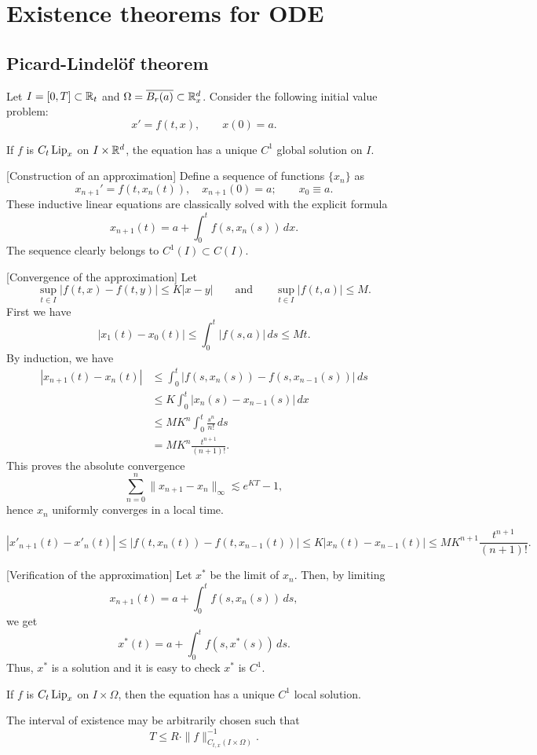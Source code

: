 \documentclass[12pt]{article}
\begin{document}
\section{Existence theorems for ODE}



\subsection{Picard-Lindel\"of theorem}
Let $I=[0,T]\subset\mathbb{R}_t$ and $\Omega=\overline{B_r(a)}\subset\mathbb{R}_x^d$.
Consider the following initial value problem:
\[x'=f(t,x),\qquad x(0)=a.\]
\begin{thm}[Global existence, $\Omega=\R^d$]
If $f$ is $C_t\operatorname{Lip}_x$ on $I\times\mathbb{R}^d$, the equation has a unique $C^1$ global solution on $I$.
\end{thm}
\begin{pf}
[Construction of an approximation]
Define a sequence of functions $\{x_n\}$ as
\[x_{n+1}'=f(t,x_n(t)),\quad x_{n+1}(0)=a;\qquad x_0\equiv a.\]
These inductive linear equations are classically solved with the explicit formula
\[x_{n+1}(t)=a+\int_0^tf(s,x_n(s))\,dx.\]
The sequence clearly belongs to $C^1(I)\subset C(I)$.

[Convergence of the approximation]
Let
\[\sup_{t\in I}|f(t,x)-f(t,y)|\le K|x-y|\qquad\text{and}\qquad\sup_{t\in I}|f(t,a)|\le M.\]
First we have
\[|x_1(t)-x_0(t)|\le\int_0^t|f(s,a)|\,ds\le Mt.\]
By induction, we have
\begin{align*}
|x_{n+1}(t)-x_n(t)|
&\le\int_0^t|f(s,x_n(s))-f(s,x_{n-1}(s))|\,ds\\
&\le K\int_0^t|x_n(s)-x_{n-1}(s)|\,dx\\
&\le MK^n\int_0^t\frac{s^n}{n!}\,ds\\
&=MK^n\frac{t^{n+1}}{(n+1)!}.
\end{align*}
This proves the absolute convergence
\[\sum_{n=0}^n\|x_{n+1}-x_n\|_\infty\lesssim e^{KT}-1,\]
hence $x_n$ uniformly converges in a local time.

\[|x'_{n+1}(t)-x'_n(t)|\le|f(t,x_n(t))-f(t,x_{n-1}(t))|\le K|x_n(t)-x_{n-1}(t)|\le MK^{n+1}\frac{t^{n+1}}{(n+1)!}.\]

[Verification of the approximation]
Let $x^*$ be the limit of $x_n$.
Then, by limiting
\[x_{n+1}(t)=a+\int_0^tf(s,x_n(s))\,ds,\]
we get
\[x^*(t)=a+\int_0^tf(s,x^*(s))\,ds.\]
Thus, $x^*$ is a solution and it is easy to check $x^*$ is $C^1$.
\end{pf}

\begin{thm}
If $f$ is $C_t\operatorname{Lip}_x$ on $I\times\Omega$, then the equation has a unique $C^1$ local solution.

The interval of existence may be arbitrarily chosen such that
\[T\le R\cdot\|f\|_{C_{t,x}(I\times\Omega)}^{-1}.\]
\end{thm}
\end{document}
